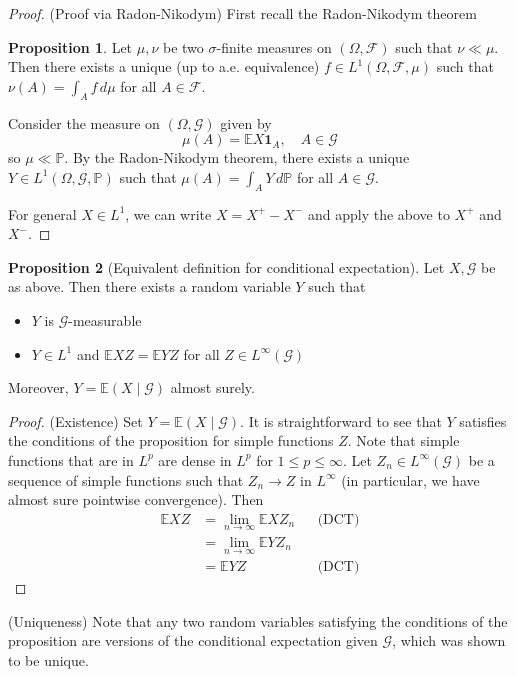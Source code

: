 \documentclass[parskip=full]{article}
\theoremstyle{definition}
\newtheorem*{proposition}{Proposition}
\newcommand{\Pbb}{\mathbb{P}}
\newcommand{\1}{\mathbbm{1}}
\newcommand{\E}{\mathbb{E}}
\begin{document}
\begin{proof}
(Proof via Radon-Nikodym)
First recall the Radon-Nikodym theorem
\begin{proposition}
    Let $\mu, \nu$ be two $\sigma$-finite measures on $(\Omega, \mathcal{F})$ such that $\nu \ll \mu$. Then there exists a unique (up to a.e. equivalence) $f \in L^1(\Omega, \mathcal{F}, \mu)$ such that $\nu(A) = \int_A f \, d\mu$ for all $A \in \mathcal{F}$.
\end{proposition}
Consider the measure on $(\Omega, \mathcal{G})$ given by
\[
    \mu(A) = \E X \mathbf{1}_A, \quad A \in \mathcal{G}
\]
so $\mu \ll \Pbb$. By the Radon-Nikodym theorem, there exists a unique $Y \in L^1(\Omega, \mathcal{G}, \Pbb)$ such that $\mu(A) = \int_A Y \, d\Pbb$ for all $A \in \mathcal{G}$.

For general $X \in L^1$, we can write $X = X^+ - X^-$ and apply the above to $X^+$ and $X^-$.
\end{proof}

\begin{proposition}[Equivalent definition for conditional expectation]
Let $X, \mathcal{G}$ be as above. Then there exists a random variable $Y$ such that
\begin{itemize}
    \item $Y$ is $\mathcal{G}$-measurable
    \item $Y \in L^1$ and $\E X Z = \E Y Z$ for all $Z \in L^\infty(\mathcal{G})$ 
\end{itemize}

Moreover, $Y = \E(X \mid \mathcal{G})$ almost surely.
\end{proposition}

\begin{proof}
(Existence)
Set $Y = \E(X \mid \mathcal{G})$. It is straightforward to see that $Y$ satisfies the conditions of the proposition for simple functions $Z$. Note that simple functions that are in $L^p$ are dense in $L^p$ for $1 \leq p \leq \infty$. Let $Z_n \in L^\infty(\mathcal{G})$ be a sequence of simple functions such that $Z_n \to Z$ in $L^\infty$ (in particular, we have almost sure pointwise convergence). Then
\begin{align*}
    \E X Z &= \lim_{n \to \infty} \E X Z_n &&\text{(DCT)}\\
    &= \lim_{n \to \infty} \E Y Z_n\\
    &= \E Y Z &&\text{(DCT)}
\end{align*}
\end{proof}

(Uniqueness) Note that any two random variables satisfying the conditions of the proposition are versions of the conditional expectation given $\mathcal{G}$, which was shown to be unique.
\end{document}
